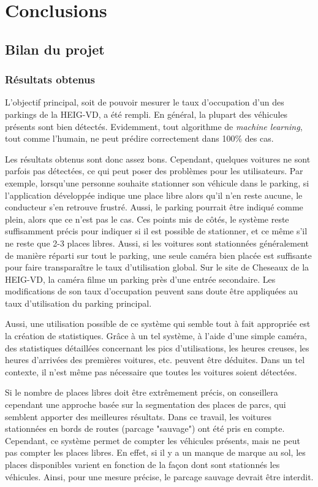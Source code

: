 \chapter{Conclusions}
\section{Bilan du projet}

\subsection{Résultats obtenus} \label{conclusion.projet.resultats}
L'objectif principal, soit de pouvoir mesurer le taux d'occupation d'un des parkings de la HEIG-VD, a été rempli. En général, la plupart des véhicules présents sont bien détectés. Evidemment, tout algorithme de \textit{machine learning}, tout comme l'humain, ne peut prédire correctement dans 100\% des cas. 

Les résultats obtenus sont donc assez bons. Cependant, quelques voitures ne sont parfois pas détectées, ce qui peut poser des problèmes pour les utilisateurs. Par exemple, lorsqu'une personne souhaite stationner son véhicule dans le parking, si l'application développée indique une place libre alors qu'il n'en reste aucune, le conducteur s'en retrouve frustré. Aussi, le parking pourrait être indiqué comme plein, alors que ce n'est pas le cas. Ces points mis de côtés, le système reste suffisamment précis pour indiquer si il est possible de stationner, et ce même s'il ne reste que 2-3 places libres. Aussi, si les voitures sont stationnées généralement de manière réparti sur tout le parking, une seule caméra bien placée est suffisante pour faire transparaître le taux d'utilisation global. Sur le site de Cheseaux de la HEIG-VD, la caméra filme un parking près d'une entrée secondaire. Les modifications de son taux d'occupation peuvent sans doute être appliquées au taux d'utilisation du parking principal. 

Aussi, une utilisation possible de ce système qui semble tout à fait appropriée est la création de statistiques. Grâce à un tel système, à l'aide d'une simple caméra, des statistiques détaillées concernant les pics d'utilisations, les heures creuses, les heures d'arrivées des premières voitures, etc. peuvent être déduites. Dans un tel contexte, il n'est même pas nécessaire que toutes les voitures soient détectées. 

Si le nombre de places libres doit être extrêmement précis, on conseillera cependant une approche basée sur la segmentation des places de parcs, qui semblent apporter des meilleures résultats. Dans ce travail, les voitures stationnées en bords de routes (parcage "sauvage") ont été pris en compte. Cependant, ce système permet de compter les véhicules présents, mais ne peut pas compter les places libres. En effet, si il y a un manque de marque au sol, les places disponibles varient en fonction de la façon dont sont stationnés les véhicules. Ainsi, pour une mesure précise, le parcage sauvage devrait être interdit.

